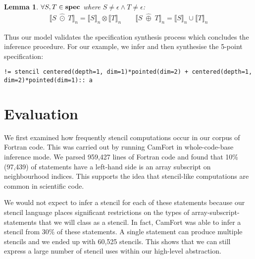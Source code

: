 \documentclass[10pt,preprint]{sigplanconf}
\newcounter{block}
\newtheorem{lemma}[block]{Lemma}
\theoremstyle{definition}
\newcommand{\interp}[1]{\llbracket{#1}\rrbracket}
\begin{document}
\begin{lemma}%
$\forall S,
  T \in \textbf{spec}$ where $S\!\neq \epsilon \wedge T\!\neq \epsilon$:
\begin{align*}
\interp{S \; \hat{\odot} \; T}_n = \interp{S}_n \otimes \interp{T}_n
  \qquad
\interp{S \; \hat{\oplus} \; T}_n = \interp{S}_n \cup \interp{T}_n
\end{align*}
\label{lem:alg-soundness}
\vspace{-2em}
\end{lemma}
%
\noindent
Thus our model validates the specification synthesis process which concludes the
inference procedure. For our example, we infer and then synthesise the
5-point specification:
\begin{verbatim}
!= stencil centered(depth=1, dim=1)*pointed(dim=2) + centered(depth=1, dim=2)*pointed(dim=1):: a
\end{verbatim}

\section{Evaluation}




We first examined how frequently stencil computations occur in our
corpus of Fortran code. This was carried out by running CamFort in
whole-code-base inference mode. We parsed 959,427 lines of Fortran
code and found that 10\% (97,439) of statements have a left-hand side
is an array subscript on neighbourhood indices. This supports the idea
that stencil-like computations are common in scientific code. 

We would not expect to infer a stencil for each of these statements
because our stencil language places significant restrictions on the
types of array-subscript-statements that we will class as a
stencil. In fact, CamFort was able to infer a stencil from 30\% of
these statements. A single statement can produce multiple stencils and
we ended up with 60,525 stencils. This shows that we can still express
a large number of stencil uses within our high-level abstraction.
\end{document}
